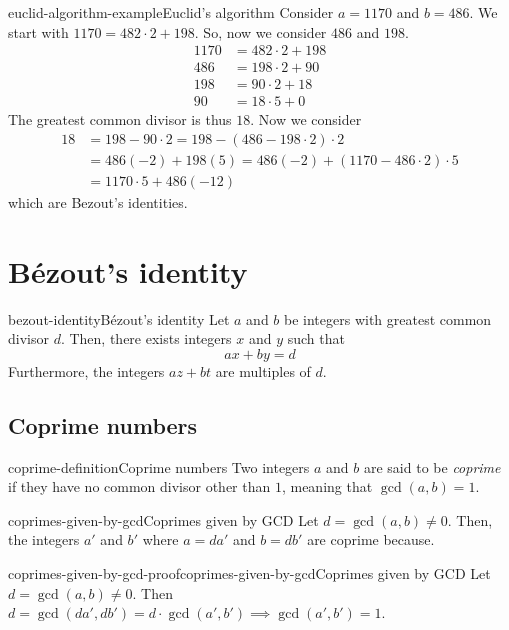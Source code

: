 \documentclass[preview]{standalone}
\begin{document}
\begin{snippetexample}{euclid-algorithm-example}{Euclid's algorithm}
    Consider \(a=1170\) and \(b=486\).
    We start with
    \(1170 = 482 \cdot 2 + 198\). So, now we consider \(486\) and \(198\).
    \begin{align*}
        1170 &= 482 \cdot 2 + 198 \\
        486 &= 198 \cdot 2 + 90 \\
        198 &= 90 \cdot 2 + 18 \\
        90 &= 18 \cdot 5 + 0
    \end{align*}
    The greatest common divisor is thus \(18\).
    Now we consider
    \begin{align*}
        18 &= 198 - 90\cdot 2 = 198 - (486 - 198 \cdot 2)\cdot 2 \\
        &= 486(-2) + 198(5) = 486(-2) + (1170 - 486\cdot 2) \cdot 5 \\
        &= 1170 \cdot 5 + 486(-12)
    \end{align*}
    which are Bezout's identities.
\end{snippetexample}

\section{Bézout's identity}

\begin{snippettheorem}{bezout-identity}{Bézout's identity}
    Let \(a\) and \(b\) be integers with greatest common divisor \(d\).
    Then, there exists integers \(x\) and \(y\) such that
    \[
        ax+by=d
    \]
    Furthermore, the integers \(az+bt\) are multiples of \(d\).
\end{snippettheorem}


\subsection{Coprime numbers}

\begin{snippetdefinition}{coprime-definition}{Coprime numbers}
    Two integers \(a\) and \(b\) are said to be \textit{coprime}
    if they have no common divisor other than \(1\), meaning that \(\gcd(a,b)=1\).
\end{snippetdefinition}

\begin{snippetproposition}{coprimes-given-by-gcd}{Coprimes given by GCD}
    Let \(d = \gcd(a, b) \neq 0\). Then, the integers \(a'\) and \(b'\) where \(a = da'\) and \(b = db'\)
    are coprime because.
\end{snippetproposition}

\begin{snippetproof}{coprimes-given-by-gcd-proof}{coprimes-given-by-gcd}{Coprimes given by GCD}
    Let \(d = \gcd(a, b) \neq 0\). Then \(d = \gcd(da', db') = d\cdot \gcd(a', b') \implies \gcd(a', b') = 1\).
\end{snippetproof}


\end{document}
